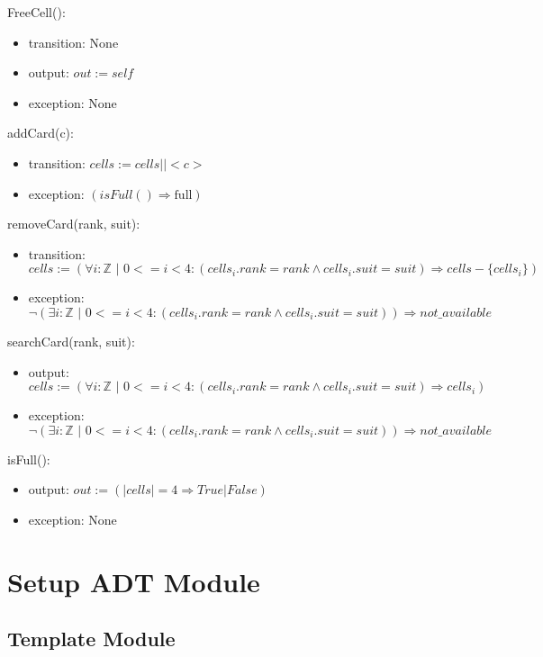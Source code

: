 \documentclass[12pt]{article}
\begin{document}
FreeCell():
\begin{itemize}
\item transition: None
\item output: $out := self$
\item exception: None
\end{itemize}

\noindent addCard(c):
\begin{itemize}
\item transition: $cells := cells || < c > $
\item exception: $( isFull() \Rightarrow \mbox{full}) $\\ 
\end{itemize}

\noindent removeCard(rank, suit):
\begin{itemize}
\item transition: $cells := (\forall i :\mathbb{Z}\,\,|\,\,0 <= i < 4 : (cells_i.rank = rank \land cells_i.suit = suit) \Rightarrow  cells - \{cells_i\}) $
\item exception:  $\lnot(\exists i :\mathbb{Z}\,\,|\,\,0 <= i < 4 : (cells_i.rank = rank \land cells_i.suit = suit)) \Rightarrow  not\_available $
\end{itemize}

\noindent searchCard(rank, suit):
\begin{itemize}
\item output: $cells := (\forall i :\mathbb{Z}\,\,|\,\,0 <= i < 4 : (cells_i.rank = rank \land cells_i.suit = suit) \Rightarrow  cells_i) $
\item exception:  $\lnot(\exists i :\mathbb{Z}\,\,|\,\,0 <= i < 4 : (cells_i.rank = rank \land cells_i.suit = suit)) \Rightarrow  not\_available $
\end{itemize}
\noindent isFull():
\begin{itemize}
\item output: $out := (|cells| = 4 \Rightarrow True | False)$
\item exception: None
\end{itemize}


\newpage

\section* {Setup ADT Module}

\subsection*{Template Module}
\end{document}

